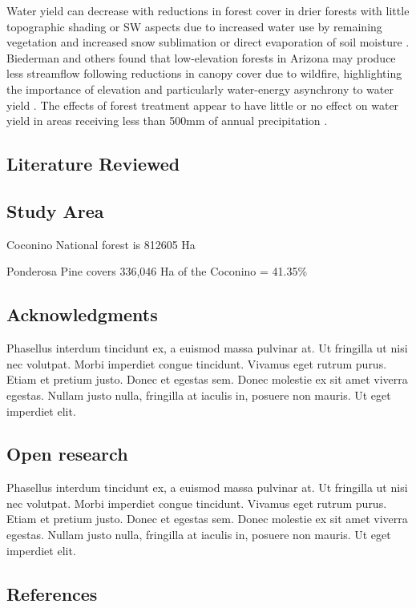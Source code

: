 \documentclass[
  number]{elsarticle}
\begin{document}
Water yield can decrease with reductions in forest cover in drier
forests with little topographic shading or SW aspects due to increased
water use by remaining vegetation and increased snow sublimation or
direct evaporation of soil moisture
\citep{biederman_recent_2015, goeking_forests_2020}. Biederman and
others \citep{biederman_streamflow_2022} found that low-elevation
forests in Arizona may produce less streamflow following reductions in
canopy cover due to wildfire, highlighting the importance of elevation
and particularly water-energy asynchrony to water yield
\citep{webb2024}. The effects of forest treatment appear to have little
or no effect on water yield in areas receiving less than 500mm of annual
precipitation
\citep{biederman_streamflow_2022, carroll_evaluating_2016, adams_ecohydrological_2012, zou_streamflow_2010, hibbert1979}.

\subsection{Literature Reviewed}\label{literature-reviewed}

\subsection{Study Area}\label{study-area}

Coconino National forest is 812605 Ha

Ponderosa Pine covers 336,046 Ha of the Coconino = 41.35\%

\subsection{Acknowledgments}\label{acknowledgments}

Phasellus interdum tincidunt ex, a euismod massa pulvinar at. Ut
fringilla ut nisi nec volutpat. Morbi imperdiet congue tincidunt.
Vivamus eget rutrum purus. Etiam et pretium justo. Donec et egestas sem.
Donec molestie ex sit amet viverra egestas. Nullam justo nulla,
fringilla at iaculis in, posuere non mauris. Ut eget imperdiet elit.

\subsection{Open research}\label{open-research}

Phasellus interdum tincidunt ex, a euismod massa pulvinar at. Ut
fringilla ut nisi nec volutpat. Morbi imperdiet congue tincidunt.
Vivamus eget rutrum purus. Etiam et pretium justo. Donec et egestas sem.
Donec molestie ex sit amet viverra egestas. Nullam justo nulla,
fringilla at iaculis in, posuere non mauris. Ut eget imperdiet elit.

\subsection*{References}\label{references}

\renewcommand{\bibsection}{}

\end{document}
